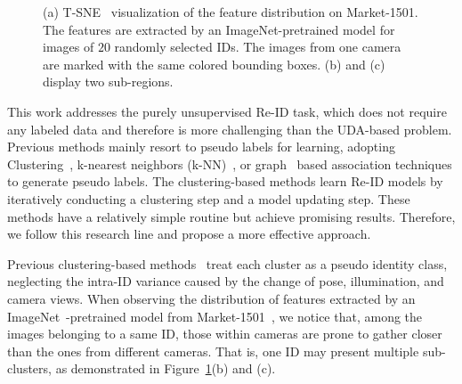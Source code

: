 \documentclass[letterpaper]{article} %
\begin{document}
\begin{figure}[t]
\begin{subfigure}{0.117\textwidth}
\caption{}
\end{subfigure}
\caption{(a) T-SNE~\cite{vanDerMaaten2008} visualization of the feature distribution on Market-1501. The features are extracted by an ImageNet-pretrained model for images of $20$ randomly selected IDs. The images from one camera are marked with the same colored bounding boxes. (b) and (c) display two sub-regions.}
\label{fig_intro}
\end{figure}


This work addresses the purely unsupervised Re-ID task, which does not require any labeled data and therefore is more challenging than the UDA-based problem. Previous methods mainly resort to pseudo labels for learning, adopting Clustering~\cite{lin2019aBottom,zeng2020hierarchical}, k-nearest neighbors (k-NN)~\cite{li2018unsupervised,chen2018deepa}, or graph~\cite{ye2017dynamic,wu2019graph} based association techniques to generate pseudo labels. The clustering-based methods learn Re-ID models by iteratively conducting a clustering step and a model updating step. These methods have a relatively simple routine but achieve promising results. Therefore, we follow this research line and propose a more effective approach.  



Previous clustering-based methods~\cite{lin2019aBottom,zeng2020hierarchical,unsup_clustering,zhai2020ad} treat each cluster as a pseudo identity class, neglecting the intra-ID variance caused by the change of pose, illumination, and camera views. When observing the distribution of features extracted by an ImageNet~\cite{krizhevsky2012imagenet}-pretrained model from Market-1501~\cite{7410490}, we notice that, among the images belonging to a same ID, those within cameras are prone to gather closer than the ones from different cameras. That is, one ID may present multiple sub-clusters, as demonstrated in Figure~\ref{fig_intro}(b) and (c).
\end{document}
